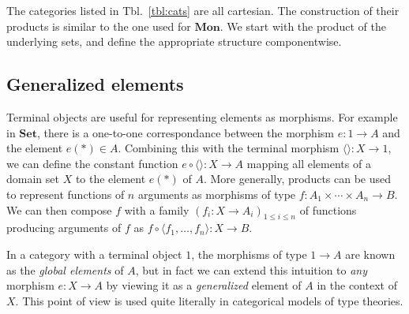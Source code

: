 \documentclass[11pt,oneside,draft]{book}
\theoremstyle{definition}
\begin{document}
The categories listed in Tbl.~\ref{tbl:cats} are all cartesian.
The construction of their products is similar to
the one used for $\mathbf{Mon}$.
We start with the product of the underlying sets,
and define the appropriate structure componentwise.


\subsection{Generalized elements} %

Terminal objects are useful for representing elements as morphisms.
For example in $\mathbf{Set}$,
there is a one-to-one correspondance between the morphism
$e : 1 \rightarrow A$ and the element $e(*) \in A$.
Combining this with the terminal morphism $\langle \rangle : X \rightarrow 1$,
we can define the constant function
$e \circ \langle \rangle : X \rightarrow A$
mapping all elements of a domain set $X$
to the element $e(*)$ of $A$.
More generally,
products can be used to represent functions
of $n$ arguments as morphisms of type
$f : A_1 \times \cdots \times A_n \rightarrow B$.
We can then compose $f$ with a family
$(f_i : X \rightarrow A_i)_{1 \le i \le n}$
of functions producing arguments of $f$
as $f \circ \langle f_1, \ldots, f_n \rangle : X \rightarrow B$.

In a category with a terminal object $1$,
the morphisms of type $1 \rightarrow A$ are known as
the \emph{global elements} of $A$,
but in fact we can extend this intuition to \emph{any}
morphism $e : X \rightarrow A$
by viewing it as a \emph{generalized} element of $A$
in the context of $X$.
This point of view is used quite literally
in categorical models of type theories.
\end{document}

